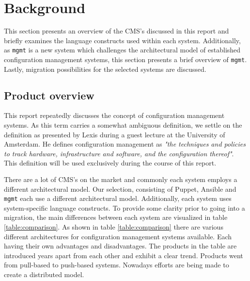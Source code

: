 \section{Background}\label{sec:background}
This section presents an overview of the CMS's discussed in this report and briefly examines the language constructs used within each system. Additionally, as \texttt{mgmt} is a new system which challenges the architectural model of established configuration management systems, this section presents a brief overview of \texttt{mgmt}. Lastly, migration possibilities for the selected systems are discussed.

\subsection{Product overview}
This report repeatedly discusses the concept of configuration management systems. As this term carries a somewhat ambiguous definition, we settle on the definition as presented by Lexis \cite{lexis_2016} during a guest lecture at the University of Amsterdam. He defines configuration management as \textit{"the techniques and policies to track hardware, infrastructure and software, and the configuration thereof"}. This definition will be used exclusively during the course of this report.

There are a lot of CMS's on the market and commonly each system employs a different architectural model. Our selection, consisting of Puppet, Ansible and \texttt{mgmt} each use a different architectural model. Additionally, each system uses system-specific language constructs. To provide some clarity prior to going into a migration, the main differences between each system are visualized in table \ref{table:comparison}. As shown in table \ref{table:comparison} there are various different architectures for configuration management systems available. Each having their own advantages and disadvantages. The products in the table are introduced years apart from each other and exhibit a clear trend. Products went from pull-based to push-based systems. Nowadays efforts are being made to create a distributed model.

